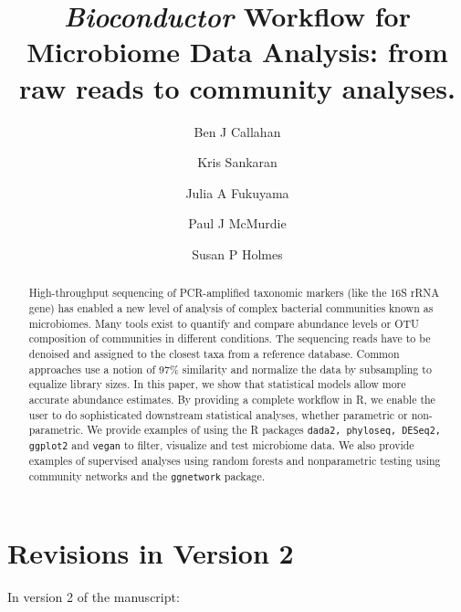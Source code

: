 \documentclass[9pt,a4paper]{extarticle}\usepackage[]{graphicx}\usepackage[]{color}
\begin{document}
\pagestyle{front}

\title{\textit{Bioconductor} Workflow for Microbiome Data Analysis: from raw reads to community analyses.}
\author[1]{Ben J Callahan}
\author[1]{Kris Sankaran}
\author[1]{Julia A Fukuyama}
\author[4]{Paul J McMurdie}
\author[1*]{Susan P Holmes}


\maketitle \thispagestyle{front}

\begin{abstract}
High-throughput sequencing of PCR-amplified taxonomic markers
(like the 16S rRNA gene)
has enabled a new level of analysis of
complex bacterial communities known as microbiomes.  Many tools exist
to quantify and compare abundance levels or OTU composition of
communities in different conditions.  The sequencing reads have to be
denoised and assigned to the closest taxa from a reference
database. Common approaches use a notion of 97\% similarity and
normalize the data by subsampling to equalize library sizes.  In this
paper, we show that statistical models allow more accurate abundance
estimates. By providing a complete workflow in R, we enable the user
to do sophisticated downstream statistical analyses, whether
parametric or non-parametric. We provide examples of using the  R
packages {\tt dada2, phyloseq, DESeq2, ggplot2} and {\tt vegan} to filter, visualize and
test microbiome data. We also provide examples of supervised analyses using random
forests and nonparametric testing using community networks and the {\tt ggnetwork}
package.
\end{abstract}
\section*{Revisions in Version 2}
In version 2 of the manuscript:
\end{document}
